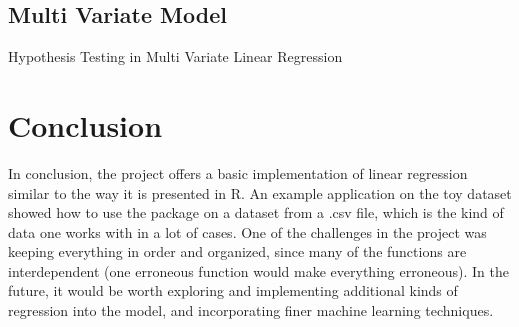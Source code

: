 \documentclass[11pt,a4paper]{article}
\begin{document}
\subsection{Multi Variate Model}
\begin{table}[H]
    \centering
    \caption{Hypothesis Testing in Multi Variate Linear Regression}
\end{table}

\newpage
\section{Conclusion}
In conclusion, the project offers a basic implementation of linear regression similar to the way it is presented in R.
An example application on the toy dataset showed how to use the package on a dataset from a .csv file, which is the kind of data one works with in a lot of cases.
One of the challenges in the project was keeping everything in order and organized, since many of the functions are interdependent (one erroneous function would make everything erroneous).
In the future, it would be worth exploring and implementing additional kinds of regression into the model, and incorporating finer machine learning techniques.
\end{document}
